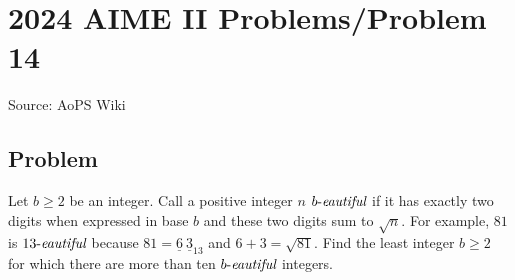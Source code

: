 \documentclass[12pt]{article}
\begin{document}
\section*{{2024 AIME II Problems/Problem 14}}
Source: AoPS Wiki

\subsection*{Problem}
Let \(b\ge 2\) be an integer. Call a positive integer \(n\) \(b\text-\textit{eautiful}\) if it has exactly two digits when expressed in base \(b\) and these two digits sum to \(\sqrt n\). For example, \(81\) is \(13\text-\textit{eautiful}\) because \(81 = \underline{6} \ \underline{3}_{13} \) and \(6 + 3 = \sqrt{81}\). Find the least integer \(b\ge 2\) for which there are more than ten \(b\text-\textit{eautiful}\) integers.
\end{document}
